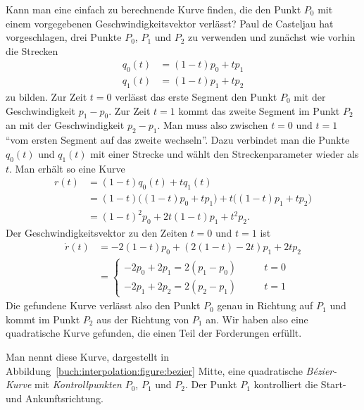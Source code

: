 Kann man eine einfach zu berechnende Kurve finden, die den Punkt $P_0$
mit einem vorgegebenen Geschwindigkeitsvektor verlässt?
Paul de Casteljau hat vorgeschlagen, drei Punkte $P_0$, $P_1$ und $P_2$
%
%
zu verwenden und zunächst wie vorhin die Strecken 
\begin{align*}
q_0(t) &= (1-t) p_0 + t p_1 \\
q_1(t) &= (1-t) p_1 + t p_2 
\end{align*}
zu bilden.
Zur Zeit $t=0$ verlässt das erste Segment den Punkt $P_0$ mit der
Geschwindigkeit $p_1-p_0$.
Zur Zeit $t=1$ kommt das zweite Segment im Punkt $P_2$ an mit der
Geschwindigkeit $p_2-p_1$.
Man muss also zwischen $t=0$ und $t=1$ ``vom ersten Segment auf das zweite
wechseln''.
Dazu verbindet man die Punkte $q_0(t)$ und $q_1(t)$ mit einer Strecke und
wählt den Streckenparameter wieder als $t$.
Man erhält so eine Kurve
\begin{align*}
r(t)
&=
(1-t) q_0(t) + t q_1(t)
\\
&=
(1-t) \bigl( (1-t)p_0 + tp_1\bigr)
+
t \bigl( (1-t)p_1 + tp_2\bigr)
\\
&=
(1-t)^2 p_0 + 2t(1-t) p_1 + t^2 p_2.
\end{align*}
Der Geschwindigkeitsvektor zu den Zeiten $t=0$ und $t=1$ ist
\begin{align*}
\dot{r}(t)
&=
-2(1-t)p_0 + (2(1-t)-2t) p_1 + 2tp_2
\\
&=\begin{cases}
-2p_0+2p_1=2(p_1-p_0)&\qquad t=0
\\
-2p_1+2p_2=2(p_2-p_1)&\qquad t=1
\end{cases}
\end{align*}
Die gefundene Kurve verlässt also den Punkt $P_0$ genau in Richtung
auf $P_1$ und kommt im Punkt $P_2$ aus der Richtung von $P_1$ an.
Wir haben also eine quadratische Kurve gefunden, die einen Teil 
der Forderungen erfüllt.

Man nennt diese Kurve, dargestellt in
Abbildung~\ref{buch:interpolation:figure:bezier} Mitte,
eine quadratische {\em Bézier-Kurve} mit
%
{\em Kontrollpunkten} $P_0$, $P_1$ und $P_2$.
%
Der Punkt $P_1$ kontrolliert die Start- und Ankunftsrichtung.
%
%

